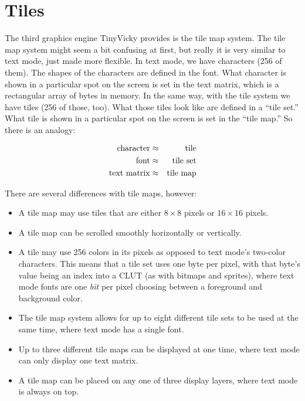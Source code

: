 \chapter{Tiles}
The third graphics engine TinyVicky provides is the tile map system. The tile map system might seem a bit confusing at first, but really it is very similar to text mode, just made more flexible. In text mode, we have characters (256 of them). The shapes of the characters are defined in the font. What character is shown in a particular spot on the screen is set in the text matrix, which is a rectangular array of bytes in memory. In the same way, with the tile system we have tiles (256 of those, too). What those tiles look like are defined in a ``tile set.'' What tile is shown in a particular spot on the screen is set in the ``tile map.'' So there is an analogy:

\begin{eqnarray*}
    {\rm character} & \approx & {\rm tile} \\
    {\rm font} & \approx & {\rm tile\ set} \\
    {\rm text\ matrix} & \approx & {\rm tile\ map} \\
\end{eqnarray*}

There are several differences with tile maps, however:

\begin{itemize}
    \item A tile map may use tiles that are either $8 \times 8$ pixels or $16 \times 16$ pixels.

    \item A tile map can be scrolled smoothly horizontally or vertically.

    \item A tile may use 256 colors in its pixels as opposed to text mode's two-color characters. This means that a tile set uses one byte per pixel, with that byte's value being an index into a CLUT (as with bitmaps and sprites), where text mode fonts are one {\em bit} per pixel choosing between a foreground and background color.

    \item The tile map system allows for up to eight different tile sets to be used at the same time, where text mode has a single font.

    \item Up to three different tile maps can be displayed at one time, where text mode can only display one text matrix.

    \item A tile map can be placed on any one of three display layers, where text mode is always on top.
\end{itemize}



